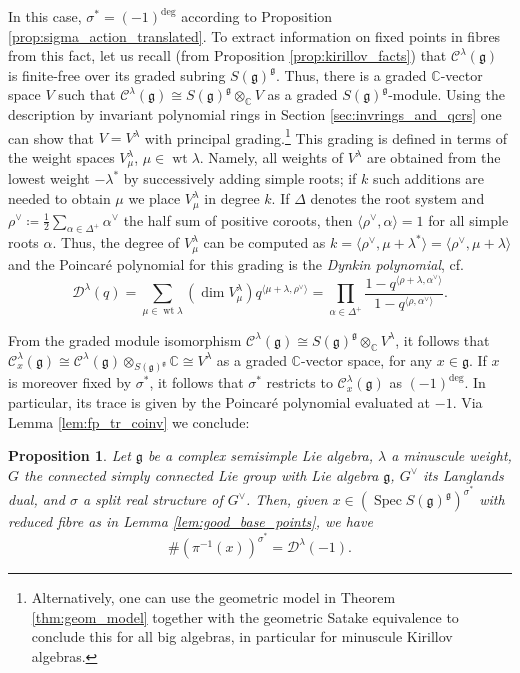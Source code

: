 \documentclass{amsart}
\newcommand{\cf}{cf.\,}
\newcommand{\C}{\mathbb{C}}
\newcommand{\Kir}{\mathcal{C}}
\newcommand{\D}{\mathcal{D}}
\newcommand{\g}{\mathfrak{g}}
\newcommand{\Spec}{\operatorname{Spec}}
\newcommand{\wt}{\operatorname{wt}}
\newcommand{\inv}{^{-1}}
\theoremstyle{definition}
\theoremstyle{plain}
\newtheorem{prop}[defn]{Proposition}
\theoremstyle{remark}
\begin{document}
In this case, $\sigma^* = (-1)^{\deg}$ according to Proposition \ref{prop:sigma_action_translated}. To extract information on fixed points in fibres from this fact, let us recall (from Proposition \ref{prop:kirillov_facts}) that $\Kir^\lambda(\g)$ is finite-free over its graded subring $S(\g)^\g$. Thus, there is a graded $\C$-vector space $V$ such that $\Kir^\lambda(\g)\cong S(\g)^\g\otimes_\C V$ as a graded $S(\g)^\g$-module. Using the description by invariant polynomial rings in Section \ref{sec:invrings_and_qcrs} one can show \cite[p.\,11]{Panyushev2004_endoj} that $V=V^\lambda$ with principal grading.\footnote{Alternatively, one can use the geometric model in Theorem \ref{thm:geom_model} together with the geometric Satake equivalence \cite{MV} to conclude this for all big algebras, in particular for minuscule Kirillov algebras.} This grading is defined in terms of the weight spaces $V^\lambda_\mu$, $\mu\in \wt{\lambda}$. Namely, all weights of $V^\lambda$ are obtained from the lowest weight $-\lambda^*$ by successively adding simple roots; if $k$ such additions are needed to obtain $\mu$ we place $V^\lambda_\mu$ in degree $k$. If $\Delta$ denotes the root system and $\rho^\vee \coloneqq \tfrac{1}{2}\sum_{\alpha\in \Delta^+}\alpha^\vee$ the half sum of positive coroots, then $\langle\rho^\vee, \alpha\rangle = 1$ for all simple roots $\alpha$. Thus, the degree of $V^\lambda_\mu$ can be computed as $k=\langle\rho^\vee, \mu + \lambda^*\rangle = \langle\rho^\vee, \mu + \lambda\rangle$ and the Poincaré polynomial for this grading is the \emph{Dynkin polynomial}, \cf\cite[\S3]{Panyushev2004_endoj}
\begin{equation}
\label{eq:dynkinpoly}
    \D^\lambda(q) 
    =
    \sum_{\mu \in \wt{\lambda}} (\dim V^\lambda_\mu) q^{\langle \mu + \lambda, \rho^\vee \rangle}
    =
    \prod_{\alpha \in \Delta^+} \frac{1 - q^{\langle \rho +\lambda, \alpha^\vee \rangle}}{1 - q^{\langle \rho, \alpha^\vee \rangle}}.
\end{equation}

From the graded module isomorphism $\Kir^\lambda(\g) \cong S(\g)^\g \otimes_\C V^\lambda$, it follows that $\Kir^\lambda_x(\g) \cong \Kir^\lambda(\g) \otimes_{S(\g)^\g} \C \cong V^\lambda$ as a graded $\C$-vector space, for any $x\in \g$. If $x$ is moreover fixed by $\sigma^*$, it follows that $\sigma^*$ restricts to $\Kir^\lambda_x(\g)$ as $(-1)^{\deg}$. In particular, its trace is given by the Poincaré polynomial evaluated at $-1$. Via Lemma \ref{lem:fp_tr_coinv} we conclude:
\begin{prop}
\label{prop:q=-1}
    Let $\g$ be a complex semisimple Lie algebra, $\lambda$ a minuscule weight, $G$ the connected simply connected Lie group with Lie algebra $\g$, $G^\vee$ its Langlands dual, and $\sigma$ a split real structure of $G^\vee$. Then, given $x\in (\Spec S(\g)^\g)^{\sigma^*}$ with reduced fibre as in Lemma \ref{lem:good_base_points}, we have
    $$
        \# (\pi\inv (x))^{\sigma^*} = \D^\lambda(-1).
    $$
\end{prop}
\end{document}
